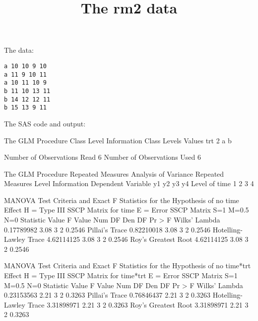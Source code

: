 \documentclass{article}
\title{The rm2 data}
\begin{document}
\maketitle
The data:
\begin{verbatim}
a 10 10 9 10
a 11 9 10 11
a 10 11 10 9
b 11 10 13 11
b 14 12 12 11
b 15 13 9 11
\end{verbatim}
The SAS code and output:
\begin{Woutput}
The GLM Procedure
   Class Level Information
Class         Levels    Values
trt                2    a b

Number of Observations Read           6
Number of Observations Used           6

The GLM Procedure
Repeated Measures Analysis of Variance
           Repeated Measures Level Information
Dependent Variable          y1       y2       y3       y4
     Level of time           1        2        3        4

                MANOVA Test Criteria and Exact F Statistics
                   for the Hypothesis of no time Effect
                     H = Type III SSCP Matrix for time
                           E = Error SSCP Matrix
                            S=1    M=0.5    N=0
Statistic                       Value   F Value   Num DF   Den DF   Pr > F
Wilks' Lambda              0.17789982      3.08        3        2   0.2546
Pillai's Trace             0.82210018      3.08        3        2   0.2546
Hotelling-Lawley Trace     4.62114125      3.08        3        2   0.2546
Roy's Greatest Root        4.62114125      3.08        3        2   0.2546

                MANOVA Test Criteria and Exact F Statistics
                 for the Hypothesis of no time*trt Effect
                   H = Type III SSCP Matrix for time*trt
                           E = Error SSCP Matrix
                            S=1    M=0.5    N=0
Statistic                       Value   F Value   Num DF   Den DF   Pr > F
Wilks' Lambda              0.23153563      2.21        3        2   0.3263
Pillai's Trace             0.76846437      2.21        3        2   0.3263
Hotelling-Lawley Trace     3.31898971      2.21        3        2   0.3263
Roy's Greatest Root        3.31898971      2.21        3        2   0.3263


\end{Woutput}
\end{document}
